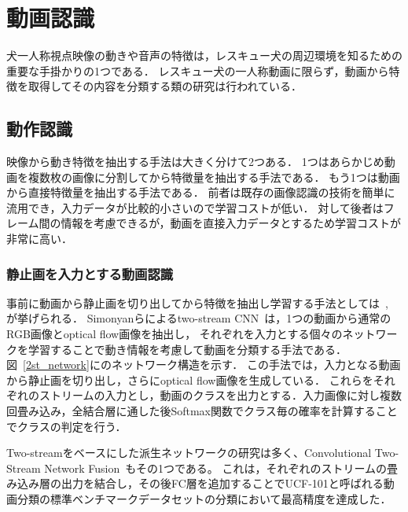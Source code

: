 \section{動画認識}
犬一人称視点映像の動きや音声の特徴は，レスキュー犬の周辺環境を知るための重要な手掛かりの1つである．
レスキュー犬の一人称動画に限らず，動画から特徴を取得してその内容を分類する類の研究は行われている．
\subsection{動作認識}
映像から動き特徴を抽出する手法は大きく分けて2つある．
1つはあらかじめ動画を複数枚の画像に分割してから特徴量を抽出する手法である．
もう1つは動画から直接特徴量を抽出する手法である．
前者は既存の画像認識の技術を簡単に流用でき，入力データが比較的小さいので学習コストが低い．
対して後者はフレーム間の情報を考慮できるが，動画を直接入力データとするため学習コストが非常に高い．
\subsubsection{静止画を入力とする動画認識}
事前に動画から静止画を切り出してから特徴を抽出し学習する手法としては~\cite{simonyan2014two}, \cite{wang2015towards}が挙げられる．
Simonyanらによるtwo-stream CNN~\cite{simonyan2014two}は，1つの動画から通常のRGB画像とoptical flow画像を抽出し，
それぞれを入力とする個々のネットワークを学習することで動き情報を考慮して動画を分類する手法である．
図~\ref{2st_network}に\cite{simonyan2014two}のネットワーク構造を示す．
この手法では，入力となる動画から静止画を切り出し，さらにoptical flow画像を生成している．
これらをそれぞれのストリームの入力とし，動画のクラスを出力とする．入力画像に対し複数回畳み込み，全結合層に通した後Softmax関数でクラス毎の確率を計算することでクラスの判定を行う．

Two-streamをベースにした派生ネットワークの研究は多く、Convolutional Two-Stream Network Fusion~\cite{a}もその1つである。
これは，それぞれのストリームの畳み込み層の出力を結合し，その後FC層を追加することでUCF-101と呼ばれる動画分類の標準ベンチマークデータセットの分類において最高精度を達成した．

